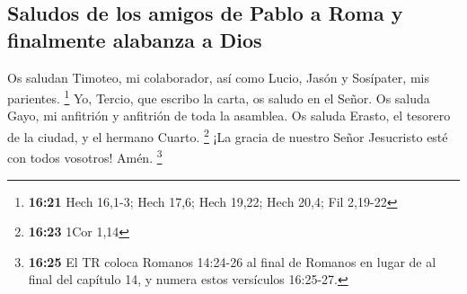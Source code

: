 \hypertarget{saludos-de-los-amigos-de-pablo-a-roma-y-finalmente-alabanza-a-dios}{%
\subsection{Saludos de los amigos de Pablo a Roma y finalmente alabanza
a
Dios}\label{saludos-de-los-amigos-de-pablo-a-roma-y-finalmente-alabanza-a-dios}}

 Os saludan Timoteo, mi colaborador, así como Lucio,
Jasón y Sosípater, mis parientes. \footnote{\textbf{16:21} Hech 16,1-3;
  Hech 17,6; Hech 19,22; Hech 20,4; Fil 2,19-22}  Yo,
Tercio, que escribo la carta, os saludo en el Señor.  Os
saluda Gayo, mi anfitrión y anfitrión de toda la asamblea. Os saluda
Erasto, el tesorero de la ciudad, y el hermano Cuarto. \footnote{\textbf{16:23}
  1Cor 1,14}  ¡La gracia de nuestro Señor Jesucristo esté
con todos vosotros! Amén.  \footnote{\textbf{16:25} El TR
  coloca Romanos 14:24-26 al final de Romanos en lugar de al final del
  capítulo 14, y numera estos versículos 16:25-27.}
